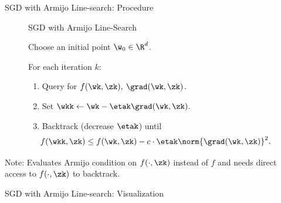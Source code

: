 \documentclass[mathserif,notheorems, hyperref={colorlinks, citecolor=blue, urlcolor=blue, linkcolor=blue}]{beamer}
\begin{document}
\begin{frame}{SGD with Armijo Line-search: Procedure}

	\begin{figure}[t]
		\begin{procedure}{SGD with Armijo Line-Search}
			\item Choose an initial point \( \w_0 \in \R^d \).
			\vspace{1ex}
			\item For each iteration \( k \):
			\begin{enumerate}
				\item Query \oracle{} for \( f(\wk, \zk), \: \grad(\wk, \zk) \).
				      \vspace{0.5ex}
				\item Set  \( \wkk \gets \wk - \etak \grad(\wk, \zk). \)
				      \vspace{0.5ex}
				\item Backtrack (decrease \( \etak \)) until
				      \[  \hspace{-1em} f(\wkk, \zk) \leq f(\wk, \zk) - c \cdot \etak \norm{\grad(\wk, \zk)}^2. \]
			\end{enumerate}
		\end{procedure}
	\end{figure}

	Note: Evaluates Armijo condition on \( f(\cdot, \zk) \) instead of \( f \) and needs direct access to \( f(\cdot, \zk) \) to backtrack.

\end{frame}

\begin{frame}{SGD with Armijo Line-search: Visualization}
	\begin{figure}[]
		\centering
		
	\end{figure}
\end{frame}
\end{document}
